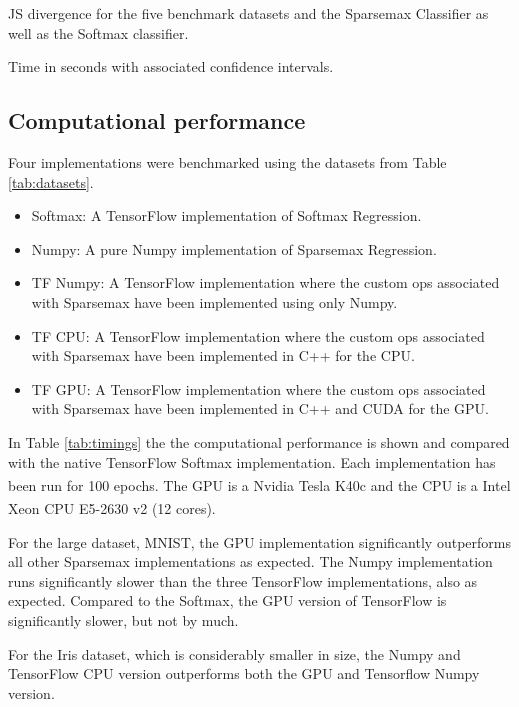 \begin{table}[H]
\centering

\caption{JS divergence for the five benchmark datasets and the Sparsemax Classifier as well as the Softmax classifier.}
\label{tab:results}
\end{table}

\begin{table}
\centering

\caption{Time in seconds with associated confidence intervals.}
\label{tab:timings}
\end{table}

\subsection{Computational performance}
Four implementations were benchmarked using the datasets from Table \ref{tab:datasets}.
\begin{itemize}
\setlength\itemsep{-0.3em}
\item Softmax: A TensorFlow implementation of Softmax Regression.
\item Numpy: A pure Numpy implementation of Sparsemax Regression.
\item TF Numpy: A TensorFlow implementation where the custom ops associated with Sparsemax have been implemented using only Numpy.
\item TF CPU: A TensorFlow implementation where the custom ops associated with Sparsemax have been implemented in C++ for the CPU.
\item TF GPU: A TensorFlow implementation where the custom ops associated with Sparsemax have been implemented in C++ and CUDA for the GPU.
\end{itemize}

In Table \ref{tab:timings} the the computational performance is shown and compared with the native TensorFlow Softmax implementation. Each implementation has been run for 100 epochs. The GPU is a Nvidia\textsuperscript{\textregistered} Tesla K40c and the CPU is a Intel\textsuperscript{\textregistered} Xeon\textsuperscript{\textregistered} CPU E5-2630 v2 (12 cores).

For the large dataset, MNIST, the GPU implementation significantly outperforms all other Sparsemax implementations as expected. The Numpy implementation runs significantly slower than the three TensorFlow implementations, also as expected. Compared to the Softmax, the GPU version of TensorFlow is significantly slower, but not by much.

For the Iris dataset, which is considerably smaller in size, the Numpy and TensorFlow CPU version outperforms both the GPU and Tensorflow Numpy version.

